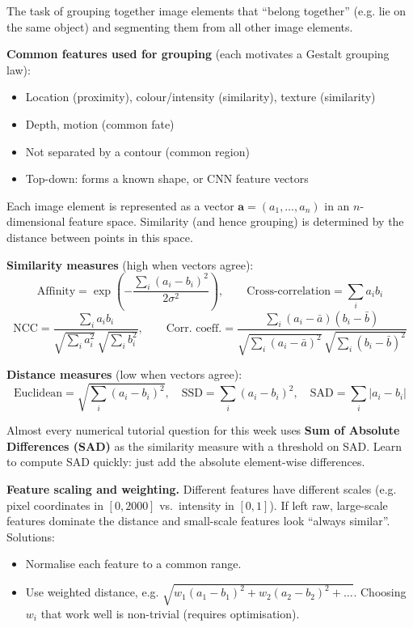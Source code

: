 \begin{defbox}
The task of grouping together image elements that ``belong together'' (e.g. lie on the same object) and segmenting them from all other image elements.
\end{defbox}

\textbf{Common features used for grouping} (each motivates a Gestalt grouping law):
\begin{itemize}
  \item Location (proximity), colour/intensity (similarity), texture (similarity)
  \item Depth, motion (common fate)
  \item Not separated by a contour (common region)
  \item Top-down: forms a known shape, or CNN feature vectors
\end{itemize}

\separator

\begin{defbox}
Each image element is represented as a vector $\mathbf{a} = (a_1, \dots, a_n)$ in an $n$-dimensional feature space. Similarity (and hence grouping) is determined by the distance between points in this space.
\end{defbox}

\textbf{Similarity measures} (high when vectors agree):
\[
\text{Affinity} = \exp\!\left(-\frac{\sum_i (a_i - b_i)^2}{2\sigma^2}\right), \qquad
\text{Cross-correlation} = \sum_i a_i b_i
\]
\[
\text{NCC} = \frac{\sum_i a_i b_i}{\sqrt{\sum_i a_i^2}\,\sqrt{\sum_i b_i^2}}, \qquad
\text{Corr.\ coeff.} = \frac{\sum_i (a_i - \bar a)(b_i - \bar b)}{\sqrt{\sum_i (a_i - \bar a)^2}\,\sqrt{\sum_i (b_i - \bar b)^2}}
\]

\textbf{Distance measures} (low when vectors agree):
\[
\text{Euclidean} = \sqrt{\textstyle\sum_i (a_i - b_i)^2}, \quad
\text{SSD} = \sum_i (a_i - b_i)^2, \quad
\text{SAD} = \sum_i |a_i - b_i|
\]

\begin{tipbox}
Almost every numerical tutorial question for this week uses \textbf{Sum of Absolute Differences (SAD)} as the similarity measure with a threshold on SAD. Learn to compute SAD quickly: just add the absolute element-wise differences.
\end{tipbox}

\separator

\textbf{Feature scaling and weighting.} Different features have different scales (e.g. pixel coordinates in $[0,2000]$ vs.\ intensity in $[0,1]$). If left raw, large-scale features dominate the distance and small-scale features look ``always similar''. Solutions:
\begin{itemize}
  \item Normalise each feature to a common range.
  \item Use weighted distance, e.g. $\sqrt{w_1(a_1{-}b_1)^2 + w_2(a_2{-}b_2)^2 + \dots}$. Choosing $w_i$ that work well is non-trivial (requires optimisation).
\end{itemize}

